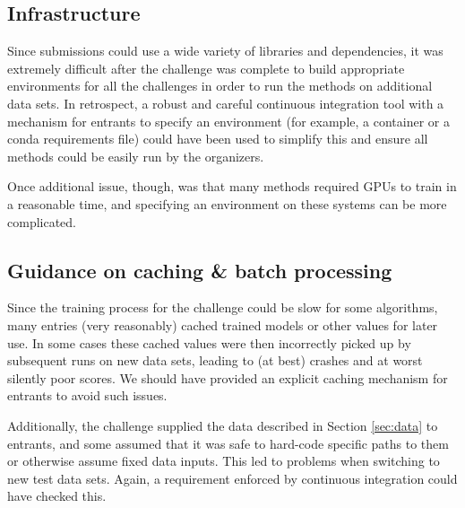 \documentclass[twocolumn,twocolappendix]{aastex63}
\begin{document}
\subsection{Infrastructure}
Since submissions could use a wide variety of libraries and dependencies, it was extremely
difficult after the challenge was complete to build appropriate environments for all the challenges
in order to run the methods on additional data sets. In retrospect, a robust and careful
continuous integration tool with a mechanism for entrants to specify an environment (for example, a 
container or a {\sc conda} requirements file) could have been used to simplify this and ensure
all methods could be easily run by the organizers.

Once additional issue, though, was that many methods required GPUs to train in a reasonable time,
and specifying an environment on these systems can be more complicated.

\subsection{Guidance on caching \& batch processing}
Since the training process for the challenge could be slow for some algorithms, many entries
(very reasonably) cached trained models or other values for later use.  In some cases these
cached values were then incorrectly picked up by subsequent runs on new data sets, leading
to (at best) crashes and at worst silently poor scores.  We should have provided an explicit
caching mechanism for entrants to avoid such issues.

Additionally, the challenge supplied the data described in Section \ref{sec:data} to entrants,
and some assumed that it was safe to hard-code specific paths to them or
otherwise assume fixed data inputs.  This led to problems when switching to new test data sets. 
Again, a requirement enforced by continuous integration could have checked this.

\end{document}
